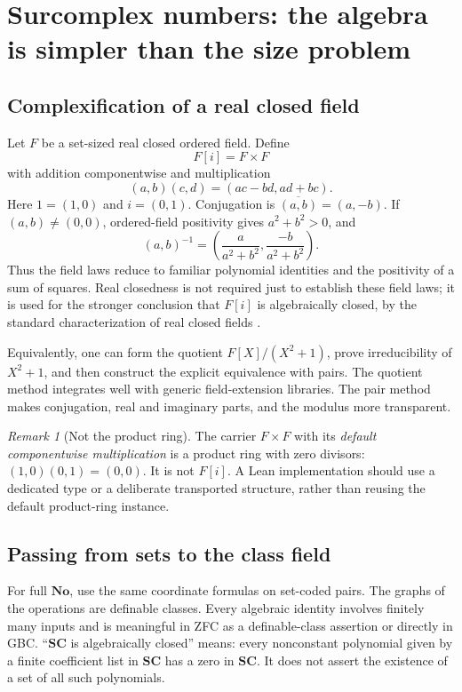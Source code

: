 \documentclass[11pt,letterpaper]{article}
\theoremstyle{definition}
\theoremstyle{remark}
\newtheorem{remark}[theorem]{Remark}
\newcommand{\No}{\mathbf{No}}
\newcommand{\SC}{\mathbf{SC}}
\numberwithin{equation}{section}
\begin{document}
\section{Surcomplex numbers: the algebra is simpler than the size problem}\label{sec:surcomplex}

\subsection{Complexification of a real closed field}
Let \(F\) be a set-sized real closed ordered field. Define
\[
 F[i]=F\times F
\]
with addition componentwise and multiplication
\begin{equation}\label{eq:pairmul}
 (a,b)(c,d)=(ac-bd,ad+bc).
\end{equation}
Here \(1=(1,0)\) and \(i=(0,1)\). Conjugation is \(\overline{(a,b)}=(a,-b)\). If \((a,b)\ne(0,0)\), ordered-field positivity gives \(a^2+b^2>0\), and
\begin{equation}\label{eq:pairinv}
 (a,b)^{-1}=\left(\frac{a}{a^2+b^2},\frac{-b}{a^2+b^2}\right).
\end{equation}
Thus the field laws reduce to familiar polynomial identities and the positivity of a sum of squares. Real closedness is not required just to establish these field laws; it is used for the stronger conclusion that \(F[i]\) is algebraically closed, by the standard characterization of real closed fields \cite{Conway,Gonshor}.

Equivalently, one can form the quotient \(F[X]/(X^2+1)\), prove irreducibility of \(X^2+1\), and then construct the explicit equivalence with pairs. The quotient method integrates well with generic field-extension libraries. The pair method makes conjugation, real and imaginary parts, and the modulus more transparent.

\begin{remark}[Not the product ring]
The carrier \(F\times F\) with its \emph{default componentwise multiplication} is a product ring with zero divisors: \((1,0)(0,1)=(0,0)\). It is not \(F[i]\). A Lean implementation should use a dedicated type or a deliberate transported structure, rather than reusing the default product-ring instance.
\end{remark}

\subsection{Passing from sets to the class field}
For full \(\No\), use the same coordinate formulas on set-coded pairs. The graphs of the operations are definable classes. Every algebraic identity involves finitely many inputs and is meaningful in ZFC as a definable-class assertion or directly in GBC. ``\(\SC\) is algebraically closed'' means: every nonconstant polynomial given by a finite coefficient list in \(\SC\) has a zero in \(\SC\). It does not assert the existence of a set of all such polynomials.
\end{document}
